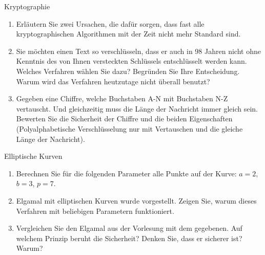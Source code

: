 \documentclass{article}
\begin{document}
\begin{exercise}{Kryptographie}
 \begin{enumerate}
  \item Erläutern Sie zwei Ursachen, die dafür sorgen, dass fast alle kryptographischen Algorithmen mit der Zeit nicht mehr Standard sind.
  \item Sie möchten einen Text so verschlüsseln, dass er auch in 98 Jahren nicht ohne Kenntnis des von Ihnen versteckten Schlüssels entschlüsselt werden kann. Welches Verfahren wählen Sie dazu? Begründen Sie Ihre Entscheidung. Warum wird das Verfahren heutzutage nicht überall benutzt?
  \item Gegeben eine Chiffre, welche Buchstaben A-N mit Buchstaben N-Z vertauscht. Und gleichzeitig muss die Länge der Nachricht immer gleich sein. Bewerten Sie die Sicherheit der Chiffre und die beiden Eigenschaften (Polyalphabetische Verschlüsselung nur mit Vertauschen und die gleiche Länge der Nachricht).
 \end{enumerate}

  \begin{solution}
  \end{solution}
\end{exercise}

\begin{exercise}{Elliptische Kurven}
  \begin{enumerate}
    \item Berechnen Sie für die folgenden Parameter alle Punkte auf der Kurve: $a = 2$, $b = 3$, $p = 7$.
    \item Elgamal mit elliptischen Kurven wurde vorgestellt. Zeigen Sie, warum dieses Verfahren mit beliebigen Parametern funktioniert.
    \item Vergleichen Sie den Elgamal aus der Vorlesung mit dem gegebenen. Auf welchem Prinzip beruht die Sicherheit? Denken Sie, dass er sicherer ist? Warum?
  \end{enumerate}

  \begin{solution}
  \end{solution}
\end{exercise}
\end{document}
